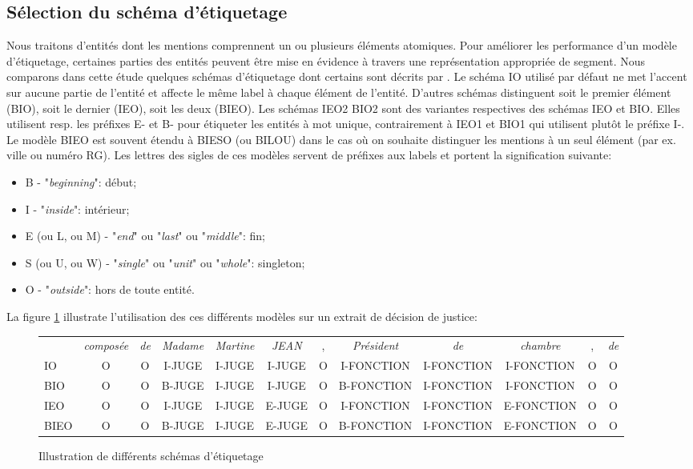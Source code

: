 \subsection{Sélection du schéma d'étiquetage}
Nous traitons d'entités dont les mentions comprennent un ou plusieurs éléments atomiques. Pour améliorer les performance d'un modèle d'étiquetage, certaines parties des entités peuvent être mise en évidence à travers une représentation appropriée de segment. Nous comparons dans cette étude quelques schémas d'étiquetage dont certains sont décrits par \citet{konkol2015tagModel}. Le schéma IO utilisé par défaut ne met l'accent sur aucune partie de l'entité et affecte le même label à chaque élément de l'entité. D'autres schémas distinguent soit le premier élément (BIO), soit le dernier (IEO), soit les deux (BIEO). Les schémas IEO2 BIO2 sont des variantes respectives des schémas IEO et BIO. Elles utilisent resp. les préfixes E- et B- pour étiqueter les entités à mot unique, contrairement à IEO1 et BIO1 qui utilisent plutôt le préfixe I-. Le modèle BIEO est souvent étendu à BIESO (ou BILOU) dans le cas où on souhaite distinguer les mentions à un seul élément (par ex. ville ou numéro RG). Les lettres des sigles de ces modèles servent de préfixes aux labels et portent la signification suivante:

\begin{itemize}
\item B - "\textit{beginning}": début;
\item I - "\textit{inside}": intérieur;
\item E (ou L, ou M) - "\textit{end}" ou "\textit{last}" ou "\textit{middle}": fin;
\item S (ou U, ou W) - "\textit{single}" ou "\textit{unit}" ou "\textit{whole}": singleton;
\item O - "\textit{outside}": hors de toute entité.
\end{itemize}

La figure \ref{p4_sample-tagmod} illustrate l'utilisation des ces différents modèles sur un extrait de décision de justice:
\begin{figure}[!h]
\tiny
\begin{tabular}{l|ccccccccccc}
 & \textit{composée} & \textit{de} & \textit{Madame} & \textit{Martine} & \textit{JEAN} & , & \textit{Président} & \textit{de} & \textit{chambre} & , & \textit{de} \\ 
IO & O & O & I-JUGE & I-JUGE & I-JUGE & O & I-FONCTION & I-FONCTION & I-FONCTION & O & O \\
BIO & O & O & B-JUGE & I-JUGE & I-JUGE & O & B-FONCTION & I-FONCTION & I-FONCTION & O & O \\
IEO & O & O & I-JUGE & I-JUGE & E-JUGE & O & I-FONCTION & I-FONCTION & E-FONCTION & O & O \\
BIEO & O & O & B-JUGE & I-JUGE & E-JUGE & O & B-FONCTION & I-FONCTION & E-FONCTION & O & O \\
\end{tabular}
\caption{Illustration de différents schémas d'étiquetage}\label{p4_sample-tagmod}
\end{figure}

